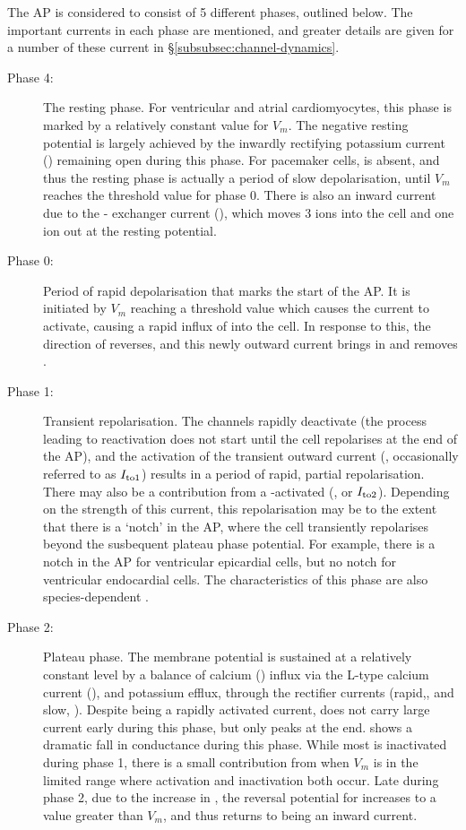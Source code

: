 \documentclass[../thesis-main.tex]{subfiles}
\begin{document}
 The AP is considered to consist of 5 different phases, outlined below. The important currents in each phase are mentioned, and greater details are given for a number of these current in \S\ref{subsubsec:channel-dynamics}.
 \begin{description}
  \item[Phase 4:] The resting phase. For ventricular and atrial cardiomyocytes, this phase is marked by a relatively constant value for $V_m$. The negative resting potential is largely achieved by the inwardly rectifying potassium current (\ikix{}) remaining open during this phase. For pacemaker cells, \ikix{} is absent, and thus the resting phase is actually a period of slow depolarisation, until $V_m$ reaches the threshold value for phase 0. There is also an inward current due to the \na{}-\ca{} exchanger current (\inaca), which moves 3 \na{} ions into the cell and one \ca{} ion out at the resting potential.
  \item[Phase 0:] Period of rapid depolarisation that marks the start of the AP. It is initiated by $V_m$ reaching a threshold value which causes the \ina{} current to activate, causing a rapid influx of \na{} into the cell. In response to this, the direction of \inaca{} reverses, and this newly outward current brings in \ca{} and removes \na{}.
  \item[Phase 1:] Transient repolarisation. The \na{} channels rapidly deactivate (the process leading to reactivation does not start until the cell repolarises at the end of the AP), and the activation of the transient \K{} outward current (\ito{}, occasionally referred to as $I_{\textnormal{to1}}$) results in a period of rapid, partial repolarisation. There may also be a contribution from a \ca{}-activated \cl (\icacl, or $I_{\textnormal{to2}}$). Depending on the strength of this current, this repolarisation may be to the extent that there is a `notch' in the AP, where the cell transiently repolarises beyond the susbequent plateau phase potential. For example, there is a notch in the AP for ventricular epicardial cells, but no notch for ventricular endocardial cells. The characteristics of this phase are also species-dependent \citep{Carmeliet2006}.
  \item[Phase 2:] Plateau phase. The membrane potential is sustained at a relatively constant level by a balance of calcium (\ca{}) influx via the L-type calcium current (\ica{}), and potassium efflux, through the rectifier \K{} currents (rapid,\ikr{}, and slow, \iks{}). Despite being a rapidly activated current, \ikr{} does not carry large current early during this phase, but only peaks at the end. \ikix{} shows a dramatic fall in conductance during this phase. While most \ina{} is inactivated during phase 1, there is a small contribution from \ina{} when $V_m$ is in the limited range where activation and inactivation both occur. Late during phase 2, due to the increase in \cai{}, the reversal potential for \inaca{} increases to a value greater than $V_m$, and thus \inaca{} returns to being an inward current.

\end{description}
\end{document}
